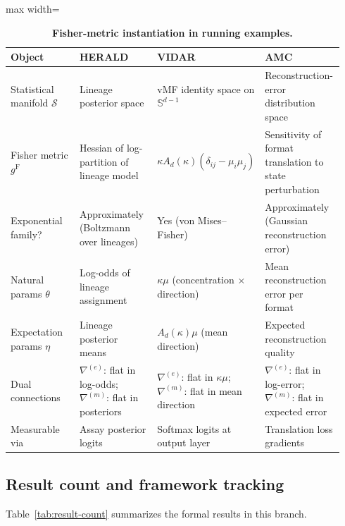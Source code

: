 \documentclass[11pt]{article}
\newcommand{\gF}{g^{\mathrm{F}}}
\theoremstyle{remark}
\begin{document}
\begin{table}[htbp]
\centering
\caption{\textbf{Fisher-metric instantiation in running examples.}}
\label{tab:fisher-instantiation}
\begin{adjustbox}{max width=\linewidth}
\begin{tabular}{p{0.22\linewidth}p{0.24\linewidth}p{0.24\linewidth}p{0.24\linewidth}}
\toprule
\textbf{Object} & \textbf{HERALD} & \textbf{VIDAR} & \textbf{AMC} \\
\midrule
Statistical manifold $\mathcal{S}$ &
Lineage posterior space &
vMF identity space on $\mathbb{S}^{d-1}$ &
Reconstruction-error distribution space \\
\addlinespace[2pt]
Fisher metric $\gF$ &
Hessian of log-partition of lineage model &
$\kappa A_d(\kappa)(\delta_{ij} - \mu_i\mu_j)$ &
Sensitivity of format translation to state perturbation \\
\addlinespace[2pt]
Exponential family? &
Approximately (Boltzmann over lineages) &
Yes (von Mises--Fisher) &
Approximately (Gaussian reconstruction error) \\
\addlinespace[2pt]
Natural params $\theta$ &
Log-odds of lineage assignment &
$\kappa\mu$ (concentration $\times$ direction) &
Mean reconstruction error per format \\
\addlinespace[2pt]
Expectation params $\eta$ &
Lineage posterior means &
$A_d(\kappa)\mu$ (mean direction) &
Expected reconstruction quality \\
\addlinespace[2pt]
Dual connections &
$\nabla^{(e)}$: flat in log-odds; $\nabla^{(m)}$: flat in posteriors &
$\nabla^{(e)}$: flat in $\kappa\mu$; $\nabla^{(m)}$: flat in mean direction &
$\nabla^{(e)}$: flat in log-error; $\nabla^{(m)}$: flat in expected error \\
\addlinespace[2pt]
Measurable via &
Assay posterior logits &
Softmax logits at output layer &
Translation loss gradients \\
\bottomrule
\end{tabular}
\end{adjustbox}
\end{table}

\subsection{Result count and framework tracking}

Table~\ref{tab:result-count} summarizes the formal results in this branch.
\end{document}
